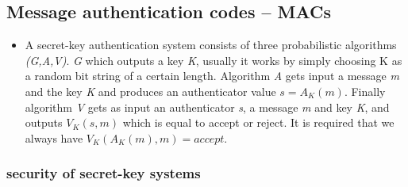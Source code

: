 \documentclass[a4paper,10pt]{article}
\begin{document}
\subsection*{Message authentication codes -- MACs}
\begin{itemize}
\item A secret-key authentication system consists of three probabilistic algorithms \textit{(G,A,V)}. \textit{G} which outputs a key \textit{K}, usually it works by simply choosing K as a random bit string of a certain length. Algorithm \textit{A} gets input a message \textit{m} and the key \textit{K} and produces an authenticator value $s = A_K(m)$. Finally
algorithm \textit{V} gets as input an authenticator \textit{s}, a message \textit{m} and key \textit{K}, and
outputs $V_K(s,m)$ which is equal to accept or reject. It is required that we
always have $V_K(A_K(m),m) = accept$.
\end{itemize}
\subsubsection*{security of secret-key systems}
\end{document}
